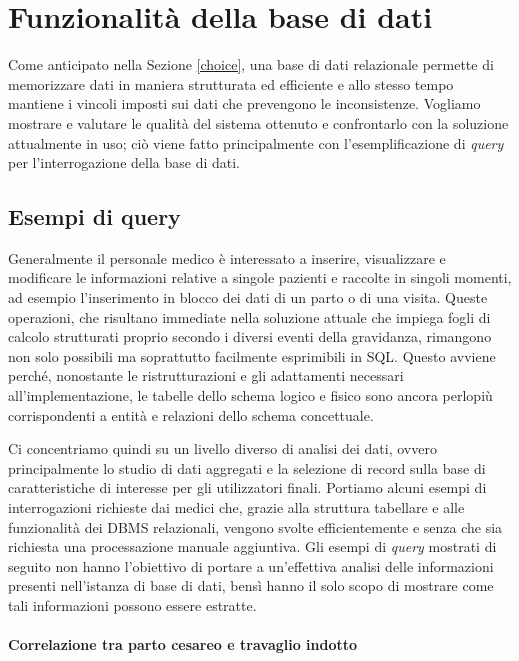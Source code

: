 \chapter{Funzionalità della base di dati}
\label{functionality}

Come anticipato nella Sezione \ref{choice}, una base di dati relazionale permette di memorizzare dati in maniera strutturata ed efficiente e allo stesso tempo mantiene i vincoli imposti sui dati che prevengono le inconsistenze.
Vogliamo mostrare e valutare le qualità del sistema ottenuto e confrontarlo con la soluzione attualmente in uso; ciò viene fatto principalmente con l'esemplificazione di \emph{query} per l'interrogazione della base di dati.

\section{Esempi di query} %

Generalmente il personale medico è interessato a inserire, visualizzare e modificare le informazioni relative a singole pazienti e raccolte in singoli momenti, ad esempio l'inserimento in blocco dei dati di un parto o di una visita.
Queste operazioni, che risultano immediate nella soluzione attuale che impiega fogli di calcolo strutturati proprio secondo i diversi eventi della gravidanza, rimangono non solo possibili ma soprattutto facilmente esprimibili in SQL.
Questo avviene perché, nonostante le ristrutturazioni e gli adattamenti necessari all'implementazione, le tabelle dello schema logico e fisico sono ancora perlopiù corrispondenti a entità e relazioni dello schema concettuale.

Ci concentriamo quindi su un livello diverso di analisi dei dati, ovvero principalmente lo studio di dati aggregati e la selezione di record sulla base di caratteristiche di interesse per gli utilizzatori finali.
Portiamo alcuni esempi di interrogazioni richieste dai medici che, grazie alla struttura tabellare e alle funzionalità dei DBMS relazionali, vengono svolte efficientemente e senza che sia richiesta una processazione manuale aggiuntiva.
Gli esempi di \emph{query} mostrati di seguito non hanno l'obiettivo di portare a un'effettiva analisi delle informazioni presenti nell'istanza di base di dati, bensì hanno il solo scopo di mostrare come tali informazioni possono essere estratte.

\subsubsection{Correlazione tra parto cesareo e travaglio indotto}

